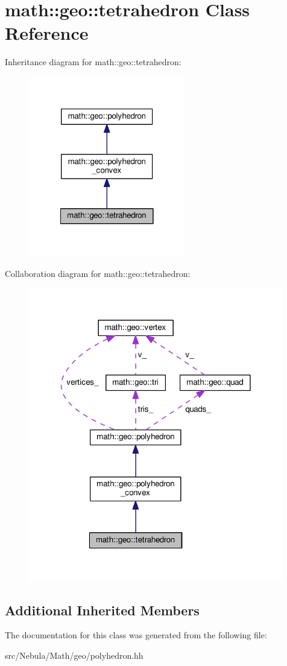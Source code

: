 \hypertarget{classmath_1_1geo_1_1tetrahedron}{\section{math\-:\-:geo\-:\-:tetrahedron Class Reference}
\label{classmath_1_1geo_1_1tetrahedron}
}


Inheritance diagram for math\-:\-:geo\-:\-:tetrahedron\-:
\nopagebreak
\begin{figure}[H]
\begin{center}
\leavevmode
\includegraphics[width=194pt]{classmath_1_1geo_1_1tetrahedron__inherit__graph}
\end{center}
\end{figure}


Collaboration diagram for math\-:\-:geo\-:\-:tetrahedron\-:
\nopagebreak
\begin{figure}[H]
\begin{center}
\leavevmode
\includegraphics[width=315pt]{classmath_1_1geo_1_1tetrahedron__coll__graph}
\end{center}
\end{figure}
\subsection*{Additional Inherited Members}


The documentation for this class was generated from the following file\-:\begin{DoxyCompactItemize}
\item 
src/\-Nebula/\-Math/geo/polyhedron.\-hh\end{DoxyCompactItemize}

